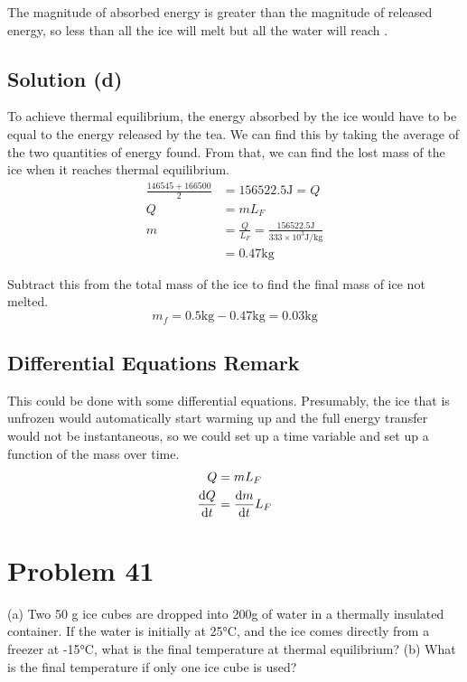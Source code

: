 \documentclass[12pt]{article}
\begin{document}
            The magnitude of absorbed energy is greater than the magnitude of released energy, so less than all the ice will melt but all the water will reach \boxed{0\unit{\celsius}}.

        \subsection{Solution (d)}
            To achieve thermal equilibrium, the energy absorbed by the ice would have to be equal to the energy released by the tea.
            We can find this by taking the average of the two quantities of energy found.
            From that, we can find the lost mass of the ice when it reaches thermal equilibrium.
            \begin{align}
                \frac{146545 + 166500}{2}   &=  156522.5\unit{\joule}   =   Q\\
                Q   &=  m L_F\\
                m   &=  \frac{Q}{L_F}
                    =   \frac{156522.5\unit{\joule}}{333 \times 10^3 \unit{\joule/\kilo\gram}}\\
                    &=  0.47 \unit{\kilo\gram}
            \end{align}

            Subtract this from the total mass of the ice to find the final mass of ice not melted.
            \begin{equation}
                m_f =   0.5 \unit{\kilo\gram} - 0.47 \unit{\kilo\gram}  =   \boxed{0.03 \unit{\kilo\gram}}
            \end{equation}

        \subsection{Differential Equations Remark}
            This could be done with some differential equations.
            Presumably, the ice that is unfrozen would automatically start warming up and the full energy transfer would not be instantaneous, so we could set up a time variable and set up a function of the mass over time. 
            \begin{gather}
                Q   =   mL_F\\
                \dv{Q}{t} = \dv{m}{t} L_F
            \end{gather}


    \pagebreak
    \section{Problem 41}
        (a) Two 50 g ice cubes are dropped into 200\unit{\gram} of water in a thermally insulated container. 
        If the water is initially at 25\unit{\celsius}, and the ice comes directly from a freezer at -15\unit{\celsius}, what is the final temperature at thermal equilibrium? 
        (b) What is the final temperature if only one ice cube is used?
    
\end{document}
